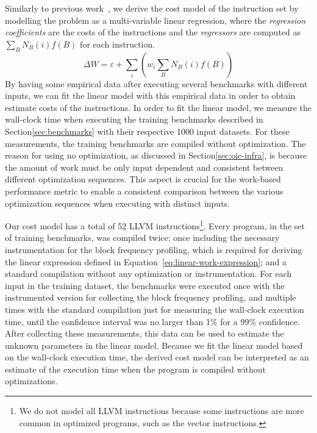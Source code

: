 Similarly to previous work~\citep{giusto01,powell09,brandolese11}, we derive the cost model of the instruction set by modelling the problem as a multi-variable linear regression, where the \textit{regression coefficients} are the costs of the instructions and the \textit{regressors} are computed as $\sum_B N_B(i)f(B)$ for each instruction.
\begin{equation}\label{eq:linear-work-expression}
\Delta W = \varepsilon + \sum_{i} \left(w_i \sum_{B} N_B(i)f(B)\right)
\end{equation}
By having some empirical data after executing several benchmarks with different inputs, we can fit the linear model with this empirical data in order to obtain estimate costs of the instructions.
In order to fit the linear model, we measure the wall-clock time when executing the training benchmarks described in Section\ref{sec:benchmarks} with their respective 1000 input datasets.
For these measurements, the training benchmarks are compiled without optimization.
The reason for using no optimization, as discussed in Section\ref{sec:oic-infra}, is because the amount of work must be only input dependent and consistent between different optimization sequences.
This aspect is crucial for the work-based performance metric to enable a consistent comparison between the various optimization sequences when executing with distinct inputs.

Our cost model has a total of 52 LLVM instructions\footnote{We do not model all LLVM instructions because some instructions are more common in optimized programs, such as the vector instructions.}.
Every program, in the set of training benchmarks, was compiled twice: once including the necessary instrumentation for the block frequency profiling, which is required for deriving the linear expression defined in Equation~\ref{eq:linear-work-expression};
and a standard compilation without any optimization or instrumentation.
For each input in the training dataset, the benchmarks were executed once with the instrumented version for collecting the block frequency profiling, and multiple times with the standard compilation just for measuring the wall-clock execution time, until the confidence interval was no larger than 1\% for a 99\% confidence.
After collecting these measurements, this data can be used to estimate the unknown parameters in the linear model.
Because we fit the linear model based on the wall-clock execution time, the derived cost model can be interpreted as an estimate of the execution time when the program is compiled without optimizations.

